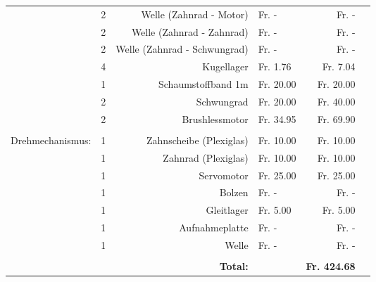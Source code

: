 \begin{figure}[h!]
\begin{tabular}{p{0.5cm}p{0.8cm}rp{3cm}rr}
          & 2     & Welle (Zahnrad - Motor) &  Fr.              -    &  Fr.             -    \\
          & 2     & Welle (Zahnrad - Zahnrad) &  Fr.              -    &  Fr.             -    \\
          & 2     & Welle (Zahnrad - Schwungrad) &  Fr.              -    &  Fr.             -    \\
          & 4     & Kugellager &  Fr.           1.76  &  Fr.          7.04  \\
          & 1     & Schaumstoffband 1m &  Fr.        20.00  &  Fr.        20.00  \\
          & 2     & Schwungrad &  Fr.        20.00  &  Fr.        40.00  \\
          & 2     & Brushlessmotor &  Fr.        34.95  &  Fr.        69.90  \\
          &       &       &       &  \\
    Drehmechanismus: & 1     & Zahnscheibe (Plexiglas) &  Fr.         10.00  &  Fr.        10.00  \\
          & 1     & Zahnrad (Plexiglas) &  Fr.         10.00  &  Fr.        10.00  \\
          & 1     & Servomotor &  Fr.        25.00  &  Fr.        25.00  \\
          & 1     & Bolzen &  Fr.              -    &  Fr.             -    \\
          & 1     & Gleitlager &  Fr.          5.00  &  Fr.          5.00  \\
          & 1     & Aufnahmeplatte &  Fr.              -    &  Fr.             -    \\
          & 1     & Welle &  Fr.              -    &  Fr.             -    \\
          &       &       &       &  \\
          &       & \textbf{Total:} & \textbf{} & \textbf{ Fr. 424.68 } \\

    \end{tabular}

\end{figure}